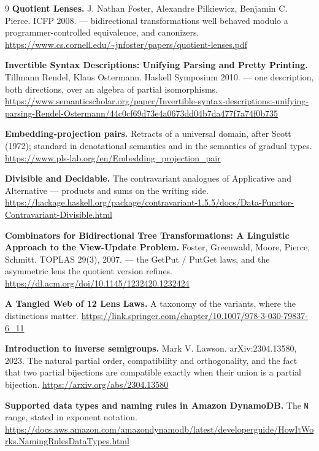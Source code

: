 \begin{thebibliography}{9}
  \textbf{Quotient Lenses.} J. Nathan Foster, Alexandre Pilkiewicz, Benjamin C. Pierce. ICFP 2008. —
  bidirectional transformations well behaved modulo a programmer-controlled equivalence, and
  canonizers.
  \url{https://www.cs.cornell.edu/~jnfoster/papers/quotient-lenses.pdf}

  \textbf{Invertible Syntax Descriptions: Unifying Parsing and Pretty Printing.} Tillmann Rendel, Klaus
  Ostermann. Haskell Symposium 2010. — one description, both directions, over an algebra of partial
  isomorphisms.
  \url{https://www.semanticscholar.org/paper/Invertible-syntax-descriptions:-unifying-parsing-Rendel-Ostermann/44c0cf69d73e4a0673dd04b7da477f7a74f0b735}

  \textbf{Embedding-projection pairs.} Retracts of a universal domain, after Scott (1972); standard in
  denotational semantics and in the semantics of gradual types.
  \url{https://www.pls-lab.org/en/Embedding_projection_pair}

  \textbf{Divisible and Decidable.} The contravariant analogues of Applicative and Alternative — products
  and sums on the writing side.
  \url{https://hackage.haskell.org/package/contravariant-1.5.5/docs/Data-Functor-Contravariant-Divisible.html}

  \textbf{Combinators for Bidirectional Tree Transformations: A Linguistic Approach to the View-Update
  Problem.} Foster, Greenwald, Moore, Pierce, Schmitt. TOPLAS 29(3), 2007. — the GetPut / PutGet
  laws, and the asymmetric lens the quotient version refines.
  \url{https://dl.acm.org/doi/10.1145/1232420.1232424}

  \textbf{A Tangled Web of 12 Lens Laws.} A taxonomy of the variants, where the distinctions matter.
  \url{https://link.springer.com/chapter/10.1007/978-3-030-79837-6_11}

  \textbf{Introduction to inverse semigroups.} Mark V. Lawson. arXiv:2304.13580, 2023. The natural
  partial order, compatibility and orthogonality, and the fact that two partial bijections are
  compatible exactly when their union is a partial bijection.
  \url{https://arxiv.org/abs/2304.13580}

  \textbf{Supported data types and naming rules in Amazon DynamoDB.} The \texttt{N} range, stated in exponent
  notation.
  \url{https://docs.aws.amazon.com/amazondynamodb/latest/developerguide/HowItWorks.NamingRulesDataTypes.html}
\end{thebibliography}
